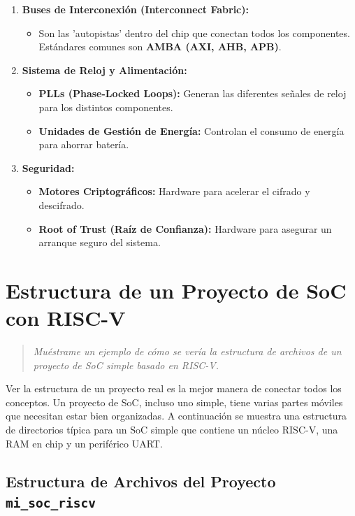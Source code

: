\documentclass[12pt,a4paper]{article}
\newenvironment{pregunta}
  {\begin{leftbar}\begin{quote}\itshape}
  {\end{quote}\end{leftbar}}
\begin{document}
\begin{enumerate}
    \item \textbf{Buses de Interconexión (Interconnect Fabric):}
    \begin{itemize}
        \item Son las 'autopistas' dentro del chip que conectan todos los componentes. Estándares comunes son \textbf{AMBA (AXI, AHB, APB)}.
    \end{itemize}

    \item \textbf{Sistema de Reloj y Alimentación:}
    \begin{itemize}
        \item \textbf{PLLs (Phase-Locked Loops):} Generan las diferentes señales de reloj para los distintos componentes.
        \item \textbf{Unidades de Gestión de Energía:} Controlan el consumo de energía para ahorrar batería.
    \end{itemize}

    \item \textbf{Seguridad:}
    \begin{itemize}
        \item \textbf{Motores Criptográficos:} Hardware para acelerar el cifrado y descifrado.
        \item \textbf{Root of Trust (Raíz de Confianza):} Hardware para asegurar un arranque seguro del sistema.
    \end{itemize}
\end{enumerate}

\newpage
\section{Estructura de un Proyecto de SoC con RISC-V}

\begin{pregunta}
Muéstrame un ejemplo de cómo se vería la estructura de archivos de un proyecto de SoC simple basado en RISC-V.
\end{pregunta}

Ver la estructura de un proyecto real es la mejor manera de conectar todos los conceptos. Un proyecto de SoC, incluso uno simple, tiene varias partes móviles que necesitan estar bien organizadas. A continuación se muestra una estructura de directorios típica para un SoC simple que contiene un núcleo RISC-V, una RAM en chip y un periférico UART.

\subsection{Estructura de Archivos del Proyecto \texttt{mi\_soc\_riscv}}
\end{document}

